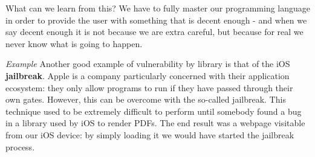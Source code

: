 \vspace{0.5em}
 
What can we learn from this? We have to fully master our programming language in order to provide the user with something that is decent enough - and when we say decent enough it is not because we are extra careful, but because for real we never know what is going to happen.

\vspace{0.5em}

\emph{Example} Another good example of vulnerability by library is that of the iOS \textbf{jailbreak}. Apple is a company particularly concerned with their application ecosystem: they only allow programs to run if they have passed through their own gates. However, this can be overcome with the so-called jailbreak. This technique used to be extremely difficult to perform until somebody found a bug in a library used by iOS to render PDFs. The end result was a webpage visitable from our iOS device: by simply loading it we would have started the jailbreak process.

\vspace{0.5em}